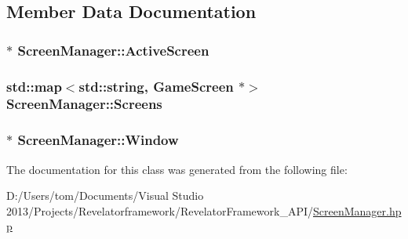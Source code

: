 \subsection{Member Data Documentation}
\hypertarget{class_screen_manager_abb46941be1b908a2b9d8053409e89597}{
\subsubsection[{Active\-Screen}]{$\ast$ Screen\-Manager\-::\-Active\-Screen\hspace{0.3cm}{\ttfamily [private]}}}\label{class_screen_manager_abb46941be1b908a2b9d8053409e89597}
\hypertarget{class_screen_manager_a54eb2c9667efda525a35d0d7043e8807}{
\subsubsection[{Screens}]{\setlength{\rightskip}{0pt plus 5cm}std\-::map$<$std\-::string, {\bf Game\-Screen} $\ast$$>$ Screen\-Manager\-::\-Screens\hspace{0.3cm}{\ttfamily [private]}}}\label{class_screen_manager_a54eb2c9667efda525a35d0d7043e8807}
\hypertarget{class_screen_manager_a5fee528eafa1b2defad2a7c4bd6766aa}{
\subsubsection[{Window}]{$\ast$ Screen\-Manager\-::\-Window\hspace{0.3cm}{\ttfamily [private]}}}\label{class_screen_manager_a5fee528eafa1b2defad2a7c4bd6766aa}


The documentation for this class was generated from the following file\-:\begin{DoxyCompactItemize}
\item 
D\-:/\-Users/tom/\-Documents/\-Visual Studio 2013/\-Projects/\-Revelatorframework/\-Revelator\-Framework\-\_\-\-A\-P\-I/\hyperlink{_screen_manager_8hpp}{Screen\-Manager.\-hpp}\end{DoxyCompactItemize}
